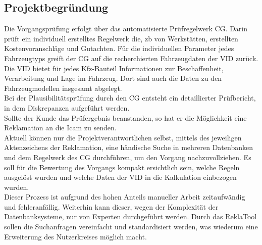 \subsection{Projektbegründung} 
\label{sec:Projektbegruendung}
Die Vorgangsprüfung erfolgt über das automatisierte Prüfregelwerk \ac{CG}.
Darin prüft ein individuell erstelltes Regelwerk die, \acs{zb} von Werkstätten, erstellten
Kostenvoranschläge und Gutachten. Für die individuellen Parameter jedes Fahrzeugtyps greift
der \acs{CG} auf die recherchierten Fahrzeugdaten der \ac{VID} zurück. 
Die \acs{VID} bietet für jedes Kfz-Bauteil Informationen zur Beschaffenheit, Verarbeitung und Lage im Fahrzeug.
Dort sind auch die Daten zu den Fahrzeugmodellen insgesamt abgelegt.\\
Bei der Plausibilitätsprüfung durch den \acs{CG} entsteht ein detaillierter Prüfbericht, in dem 
Diskrepanzen aufgeführt werden.\\
Sollte der Kunde das Prüfergebnis beanstanden, so hat er die Möglichkeit eine Reklamation an
die \acs{Icam} zu senden.\\
Aktuell können nur die Projektverantwortlichen selbst, mittels des jeweiligen Aktenzeichens der
Reklamation, eine händische Suche in mehreren Datenbanken und dem Regelwerk des \acs{CG}
durchführen, um den Vorgang nachzuvollziehen. Es soll für die Bewertung des Vorgangs kompakt
ersichtlich sein, welche Regeln ausgelöst wurden und welche Daten der \acs{VID} in die Kalkulation 
einbezogen wurden.\\
Dieser Prozess ist aufgrund des hohen Anteils manueller Arbeit zeitaufwändig und fehleranfällig.
Weiterhin kann dieser, wegen der Komplexität der Datenbanksysteme, nur von Experten durchgeführt werden.
Durch das ReklaTool sollen die Suchanfragen vereinfacht und standardisiert werden, was wiederum 
eine Erweiterung des Nutzerkreises möglich macht.

